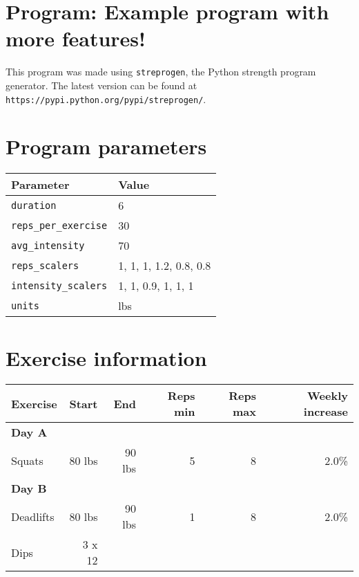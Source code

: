 \documentclass[12pt, a4paper]{article}%
\begin{document}
\large

\section*{Program: Example program with more features!}

This program was made using \verb|streprogen|,
the Python strength program generator.
The latest version can be found at \\
\verb|https://pypi.python.org/pypi/streprogen/|.


\section*{Program parameters}
\begin{tabular}{l|l}
	\textbf{Parameter} & \textbf{Value} \\ \hline
	\verb|duration|             & 6 \\
	\verb|reps_per_exercise|    & 30 \\
	\verb|avg_intensity|        & 70 \\
	\verb|reps_scalers|         & 1, 1, 1, 1.2, 0.8, 0.8 \\
	\verb|intensity_scalers|    & 1, 1, 0.9, 1, 1, 1 \\
	\verb|units|                & lbs
\end{tabular}




\section*{Exercise information}
\begin{tabular}{lrrrrr}
    \textbf{Exercise} & \textbf{Start} & \textbf{End} & \textbf{Reps min}
    & \textbf{Reps max} & \textbf{Weekly increase} \\ \hline
      \textbf{ Day A } & & & & & \\ \hline
        \hspace{0.5em}Squats & 80 lbs &
         90 lbs & 5 & 8 &
          2.0\%\\
      \textbf{ Day B } & & & & & \\ \hline
        \hspace{0.5em}Deadlifts & 80 lbs &
         90 lbs & 1 & 8 &
          2.0\%\\
       \hspace{0.5em}Dips & 3 x 12 & & & & \\
\hline
\end{tabular}
\end{document}
